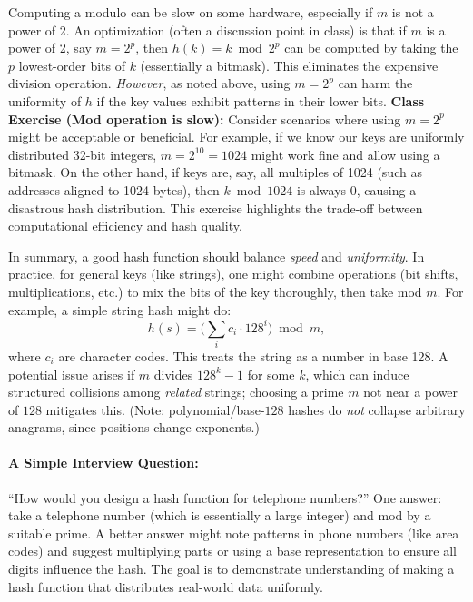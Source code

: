 \documentclass[11pt]{article}
\begin{document}
Computing a modulo can be slow on some hardware, especially if $m$ is not a power of 2. An optimization (often a discussion point in class) is that if $m$ is a power of 2, say $m=2^p$, then $h(k)=k \bmod 2^p$ can be computed by taking the $p$ lowest-order bits of $k$ (essentially a bitmask). This eliminates the expensive division operation. \emph{However}, as noted above, using $m=2^p$ can harm the uniformity of $h$ if the key values exhibit patterns in their lower bits. \textbf{Class Exercise (Mod operation is slow):} Consider scenarios where using $m=2^p$ might be acceptable or beneficial. For example, if we know our keys are uniformly distributed 32-bit integers, $m=2^{10}=1024$ might work fine and allow using a bitmask. On the other hand, if keys are, say, all multiples of 1024 (such as addresses aligned to 1024 bytes), then $k \bmod 1024$ is always 0, causing a disastrous hash distribution. This exercise highlights the trade-off between computational efficiency and hash quality.

In summary, a good hash function should balance \textit{speed} and \textit{uniformity}. In practice, for general keys (like strings), one might combine operations (bit shifts, multiplications, etc.) to mix the bits of the key thoroughly, then take mod $m$. For example, a simple string hash might do:
\[ h(s) = \Big(\sum_{i} c_i \cdot 128^i \Big) \bmod m, \] 
where $c_i$ are character codes. This treats the string as a number in base 128. A potential issue arises if $m$ divides $128^{k}-1$ for some $k$, which can induce structured collisions among \emph{related} strings; choosing a prime $m$ not near a power of $128$ mitigates this. (Note: polynomial/base-$128$ hashes do \emph{not} collapse arbitrary anagrams, since positions change exponents.)

\paragraph{A Simple Interview Question:} “How would you design a hash function for telephone numbers?” One answer: take a telephone number (which is essentially a large integer) and mod by a suitable prime. A better answer might note patterns in phone numbers (like area codes) and suggest multiplying parts or using a base representation to ensure all digits influence the hash. The goal is to demonstrate understanding of making a hash function that distributes real-world data uniformly.
\end{document}

